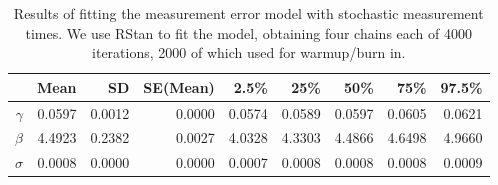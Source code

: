 \documentclass{article}
\begin{document}
\begin{table}[ht]
\centering
\begin{tabular}{rrrrrrrrr}
  \hline
 & Mean & SD & SE(Mean) & 2.5\% & 25\% & 50\% & 75\% & 97.5\% \\ 
  \hline
$\gamma$ & 0.0597 & 0.0012 & 0.0000 & 0.0574 & 0.0589 & 0.0597 & 0.0605 & 0.0621 \\ 
  $\beta$ & 4.4923 & 0.2382 & 0.0027 & 4.0328 & 4.3303 & 4.4866 & 4.6498 & 4.9660 \\ 
  $\sigma$ & 0.0008 & 0.0000 & 0.0000 & 0.0007 & 0.0008 & 0.0008 & 0.0008 & 0.0009 \\ 
   \hline
\end{tabular}
 \caption{Results of fitting the measurement error model with stochastic measurement times. We use RStan \citep{rstan-software:2015,stan-software:2015} to fit the model, obtaining four chains each of 4000 iterations, 2000 of which used for warmup/burn in.}
\end{table}


\end{document}
